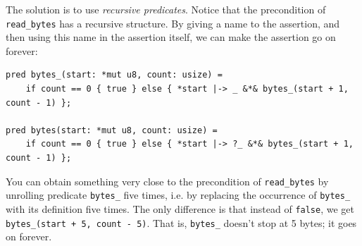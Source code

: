 \documentclass{article}
\begin{document}
The solution is to use \emph{recursive predicates}. Notice that the precondition of \lstinline!read_bytes! has a recursive structure. By giving a name to the assertion,
and then using this name in the assertion itself, we can make the assertion go on forever:
\begin{lstlisting}
pred bytes_(start: *mut u8, count: usize) =
    if count == 0 { true } else { *start |-> _ &*& bytes_(start + 1, count - 1) };

pred bytes(start: *mut u8, count: usize) =
    if count == 0 { true } else { *start |-> ?_ &*& bytes_(start + 1, count - 1) };
\end{lstlisting}
You can obtain something very close to the precondition of \lstinline!read_bytes! by unrolling predicate \lstinline|bytes_| five times, i.e. by replacing the occurrence of \lstinline!bytes_!
with its definition five times. The only difference is that instead of \lstinline!false!, we get \lstinline!bytes_(start + 5, count - 5)!. That is, \lstinline!bytes_! doesn't stop
at 5 bytes; it goes on forever.
\end{document}
